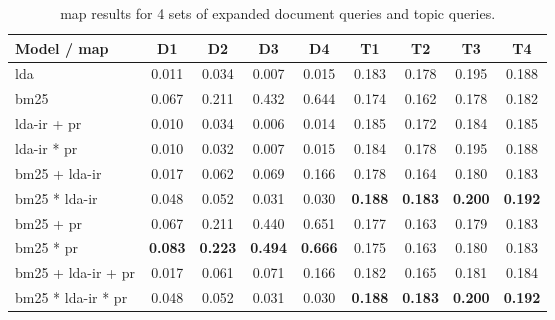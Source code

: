 \begin{table*}[h]
	\centering
	\caption{\gls{map} results for 4 sets of expanded document queries and topic queries.}
	\begin{tabular}{l|c|c|c|c|c|c|c|c}
		Model / \gls{map} & D1 & D2 & D3 & D4 & T1 & T2 & T3 & T4 \\
		\midrule
		\gls{lda} & 0.011 & 0.034 & 0.007 & 0.015 & 0.183 & 0.178 & 0.195 & 0.188 \\
		\gls{bm25} & 0.067 & 0.211 & 0.432 & 0.644 & 0.174 & 0.162 & 0.178 & 0.182 \\
		\gls{lda}-\gls{ir} + \gls{pr} & 0.010 & 0.034 & 0.006 & 0.014 & 0.185 & 0.172 & 0.184 & 0.185 \\
		\gls{lda}-\gls{ir} * \gls{pr} & 0.010 & 0.032 & 0.007 & 0.015 & 0.184 & 0.178 & 0.195 & 0.188 \\
		\gls{bm25} + \gls{lda}-\gls{ir} & 0.017 & 0.062 & 0.069 & 0.166 & 0.178 & 0.164 & 0.180 & 0.183 \\
		\gls{bm25} * \gls{lda}-\gls{ir} & 0.048 & 0.052 & 0.031 & 0.030 & \textbf{0.188} & \textbf{0.183} & \textbf{0.200} & \textbf{0.192} \\
		\gls{bm25} + \gls{pr} & 0.067 & 0.211 & 0.440 & 0.651 & 0.177 & 0.163 & 0.179 & 0.183 \\
		\gls{bm25} * \gls{pr} & \textbf{0.083} & \textbf{0.223} & \textbf{0.494} & \textbf{0.666} & 0.175 & 0.163 & 0.180 & 0.183 \\
		\gls{bm25} + \gls{lda}-\gls{ir} + \gls{pr} & 0.017 & 0.061 & 0.071 & 0.166 & 0.182 & 0.165 & 0.181 & 0.184 \\
		\gls{bm25} * \gls{lda}-\gls{ir} * \gls{pr} & 0.048 & 0.052 & 0.031 & 0.030 & \textbf{0.188} & \textbf{0.183} & \textbf{0.200} & \textbf{0.192} \\
	\end{tabular}
	\label{tab:expansion_map}
\end{table*}
